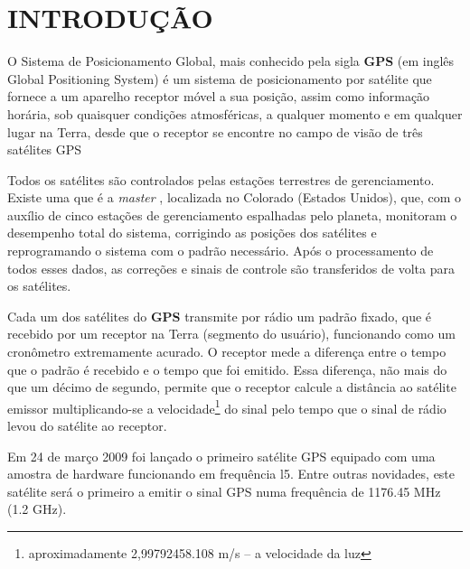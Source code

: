 
\chapter{INTRODUÇÃO}

O Sistema de Posicionamento Global, 
mais conhecido pela sigla \textbf{\huge {GPS}} %
(em inglês \foreignlanguage{english}{Global Positioning System}) %
é um sistema de posicionamento por satélite que fornece a um aparelho receptor móvel a sua posição, assim como informação horária,
sob quaisquer condições atmosféricas, a qualquer momento e em qualquer lugar na Terra, desde que
o receptor se encontre no campo de visão de três satélites GPS

Todos os satélites são controlados pelas estações terrestres de
gerenciamento. Existe uma que é a \textit{master}%
, localizada no Colorado (Estados Unidos), que, com o auxílio de cinco estações de gerenciamento
espalhadas pelo planeta, monitoram o desempenho total do sistema, corrigindo
as posições dos satélites e reprogramando o sistema com o padrão
necessário. Após o processamento de todos esses dados, as correções e
sinais de controle são transferidos de volta para os satélites.

Cada um dos satélites do \textbf{GPS} %
transmite por rádio um padrão fixado,
que é recebido por um receptor na Terra (segmento do usuário), funcionando
como um cronômetro extremamente acurado. O receptor mede a diferença
entre o tempo que o padrão é recebido e o tempo que foi emitido. Essa
diferença, não mais do que um décimo de segundo, permite que o receptor
calcule a distância ao satélite emissor multiplicando-se a 
velocidade\footnote{aproximadamente 2,99792458.108 m/s – a velocidade da luz} do sinal %
pelo tempo que o sinal de rádio levou do satélite ao receptor.

\newpage
Em 24 de março 2009 foi lançado o primeiro satélite GPS equipado com uma amostra de hardware funcionando em frequência l5.
Entre outras novidades, este satélite será o primeiro a emitir o sinal GPS numa frequência de 1176.45 MHz (1.2 GHz).\newline %

